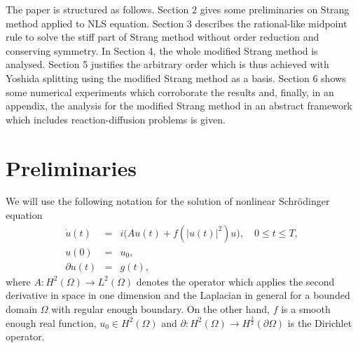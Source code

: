 \documentclass[a4paper,12pt]{article}
\begin{document}
The paper is structured as follows. Section 2 gives some preliminaries on Strang method applied to NLS equation. Section 3 describes the rational-like midpoint rule to solve the stiff part of Strang method without order reduction and conserving symmetry. In Section 4, the whole modified Strang method is analysed. Section 5 justifies the arbitrary order which is thus achieved with Yoshida splitting using the modified Strang method as a basis. Section 6 shows some numerical experiments which corroborate the results and, finally, in an appendix, the analysis for the modified Strang method in an abstract framework which includes reaction-diffusion problems is given.

\section{Preliminaries}

We will use the following notation for the solution of nonlinear Schr\"odinger equation
\begin{eqnarray}
\dot{u}(t)&=& i \big(A u(t)+f(|u(t)|^2) u\big), \quad 0 \le t \le T,\nonumber \\
u(0)&=&u_0,  \nonumber \\
\partial u(t)&=& g(t), \label{nlse}
\end{eqnarray}
where $A: H^2(\Omega)\to L^2(\Omega)$ denotes the operator which applies the second derivative in space in one dimension and the Laplacian in general for a bounded domain $\Omega$ with regular enough boundary. On the other hand, $f$ is a smooth enough real function, $u_0\in H^2(\Omega)$ and $\partial: H^2(\Omega) \to H^ {\frac{3}{2}}(\partial \Omega)$ is the Dirichlet operator.
\end{document}
